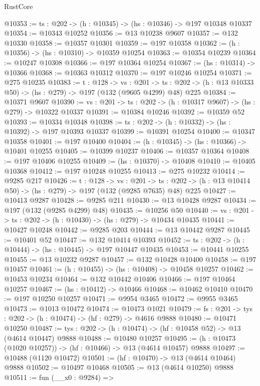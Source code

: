 \begin{lexlean}{RustCore}
\begin{coremodule}
@10353 := {ts : @202} -> (h : @10345) -> (hs : @10346) -> @197 @10348 @10337
@10354 := @10343 @10252
@10356 := @13 @10238 @9607
@10357 := @132 @10330
@10358 := @10357 @10301
@10359 := @197 @10358
@10362 := (h : @10356) -> (hs : @10310) -> @10359 @10254
@10363 := @10354 @10239
@10364 := @10247 @10308
@10366 := @197 @10364 @10254
@10367 := (hs : @10314) -> @10366
@10368 := @10363 @10312
@10370 := @197 @10246 @10254
@10371 := @275 @10235
@10383 := {t : @128} ->
  {vs : @201} ->
  {ts : @202} -> (h : @13 @10333 @50) -> (hs : @279) -> @197 (@132 (@9605 @4299) @48) @225
@10384 := @10371 @9607
@10390 := {vs : @201} -> {ts : @202} -> (h : @10317 @9607) -> (hs : @279) -> @10322 @10337
@10391 := @10384 @10246
@10392 := @10359 @52
@10393 := @10334 @10348
@10398 := {ts : @202} -> (h : @10332) -> (hs : @10392) -> @197 @10393 @10337
@10399 := @10391 @10254
@10400 := @10347 @10358
@10401 := @197 @10400
@10404 := (h : @10345) -> (hs : @10366) -> @10401 @10255
@10405 := @10399 @10237
@10406 := @10357 @10364
@10408 := @197 @10406 @10255
@10409 := (hs : @10370) -> @10408
@10410 := @10405 @10368
@10412 := @197 @10248 @10255
@10413 := @275 @10232
@10414 := @9285 @217
@10426 := {t : @128} ->
  {vs : @201} ->
  {ts : @202} -> (h : @13 @10414 @50) -> (hs : @279) -> @197 (@132 (@9285 @7635) @48) @225
@10427 := @10413 @9287
@10428 := @9285 @211
@10430 := @13 @10428 @9287
@10434 := @197 (@132 (@9285 @4299) @48)
@10435 := @10256 @50
@10440 := {vs : @201} -> {ts : @202} -> (h : @10430) -> (hs : @279) -> @10434 @10435
@10441 := @10427 @10248
@10442 := @9285 @203
@10444 := @13 @10442 @9287
@10445 := @10401 @52
@10447 := @132 @10414 @10393
@10452 := {ts : @202} -> (h : @10444) -> (hs : @10445) -> @197 @10447 @10435
@10453 := @10441 @10255
@10455 := @13 @10232 @9287
@10457 := @132 @10428 @10400
@10458 := @197 @10457
@10461 := (h : @10455) -> (hs : @10408) -> @10458 @10257
@10462 := @10453 @10234
@10464 := @132 @10442 @10406
@10466 := @197 @10464 @10257
@10467 := (hs : @10412) -> @10466
@10468 := @10462 @10410
@10470 := @197 @10250 @10257
@10471 := @9954 @3465
@10472 := @9955 @3465
@10473 := @1013 @10472
@10474 := @10473 @1021
@10479 := {fs : @201} -> {tys : @202} -> (h : @10474) -> (hf : @279) -> @4616 @9888
@10480 := @10471 @10250
@10487 := {tys : @202} -> (h : @10474) -> (hf : @10458 @52) -> @13 (@4614 @10447) @9888
@10488 := @10480 @10257
@10495 := (h : @10473 (@1020 @10257)) -> (hf : @10466) -> @13 (@4614 @10457) @9888
@10497 := @10488 (@1120 @10472)
@10501 := (hf : @10470) -> @13 (@4614 @10464) @9888
@10502 := @10497 @10468
@10505 := @13 (@4614 @10250) @9888
@10511 := fun (__x0 : @9284) =>

\end{coremodule}
\end{lexlean}
